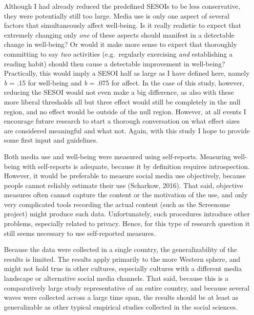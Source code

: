 \documentclass[
  english,
  man,mask,floatsintext]{apa6}
\begin{document}
Although I had already reduced the predefined SESOIs to be less conservative, they were potentially still too large.
Media use is only one aspect of several factors that simultaneously affect well-being.
Is it really realistic to expect that extremely changing only \emph{one} of these aspects should manifest in a detectable change in well-being?
Or would it make more sense to expect that thoroughly committing to say \emph{two} activities (e.g.~regularly exercising \emph{and} establishing a reading habit) should then cause a detectable improvement in well-being?
Practically, this would imply a SESOI half as large as I have defined here, namely \emph{b} = \textbar.15\textbar{} for well-being and \emph{b} = \textbar.075\textbar{} for affect.
In the case of this study, however, reducing the SESOI would not even make a big difference, as also with these more liberal thresholds all but three effect would still be completely in the null region, and no effect would be outside of the null region.
However, at all events I encourage future research to start a thorough conversation on what effect sizes are considered meaningful and what not.
Again, with this study I hope to provide some first input and guidelines.

Both media use and well-being were measured using self-reports.
Measuring well-being with self-reports is adequate, because it by definition requires introspection.
However, it would be preferable to measure social media use objectively, because people cannot reliably estimate their use (Scharkow, 2016).
That said, objective measures often cannot capture the content or the motivation of the use, and only very complicated tools recording the actual content (such as the Screenome project) might produce such data.
Unfortunately, such procedures introduce other problems, especially related to privacy.
Hence, for this type of research question it still seems necessary to use self-reported measures.

Because the data were collected in a single country, the generalizability of the results is limited.
The results apply primarily to the more Western sphere, and might not hold true in other cultures, especially cultures with a different media landscape or alternative social media channels.
That said, because this is a comparatively large study representative of an entire country, and because several waves were collected across a large time span, the results should be at least as generalizable as other typical empirical studies collected in the social sciences.
\end{document}
